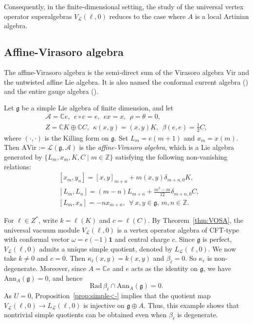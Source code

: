 \documentclass[12pt]{article}
\numberwithin{equation}{section}
\theoremstyle{definition}
\theoremstyle{plain}
\newcommand{\bC}{\ensuremath{\mathbb{C}}}
\newcommand{\bZ}{\ensuremath{\mathbb{Z}}}
\newcommand{\Rad}{\mathrm{Rad }}
\newcommand{\Ann}{\mathrm{Ann }}
\newcommand{\fg}{\mathfrak{g}}
\newcommand{\cA}{\ensuremath{\mathcal{A}}}
\newcommand{\cL}{\ensuremath{\mathcal{L}}}
\newcommand{\bone}{\mathbf{1 }}
\begin{document}
Consequently, in the finite-dimensional setting, the study of the universal vertex operator superalgebras $V_{\cL}(\ell,0)$ reduces to the case where $A$ is a local Artinian algebra.


\subsection{Affine-Virasoro algebra}
\hspace{1.5em}The affine-Virasoro algebra is the semi-direct sum of the Virasoro algebra $\mathrm{Vir}$ and the untwisted affine Lie algebra. It is also named the conformal current algebra (\cite{K86}) and the entire gauge algebra (\cite{EFK}). 

Let $\fg$ be a simple Lie algebra of finite dimension, and let
\begin{gather*}
    \cA=\bC e,\ \ e\circ e=e,\ \ ex=x,\ \ \rho=\theta=0,\\
    Z=\bC K\oplus\bC C,\ \ \kappa(x,y)=(x,y)K,\ \ \beta(e,e)=\frac{1}{2}C,
\end{gather*}
where $(\cdot,\cdot)$ is the Killing form on $\fg$. Set $L_m=e(m+1)$ and $x_m=x(m)$. Then $\mathrm{AVir}:=\cL(\fg,\cA)$ is the \emph{affine-Virasoro algebra}, which is a Lie algebra generated by $\{ L_m,x_m,K,C\mid m\in\bZ\}$ satisfying the following non-vanishing relations:
\begin{align*}
    &[x_m,y_n]=[x,y]_{m+n}+m(x,y)\delta_{m+n,0}K,\\
    &[L_m,L_n]=(m-n)L_{m+n}+\frac{m^3-m}{12}\delta_{m+n,0}C,\\
    &[L_m,x_n]=-nx_{m+n},\ \ \forall\ x,y\in\fg,\,m,n\in\bZ.
\end{align*}

For $\ell\in Z^*$, write $k=\ell(K)$ and $c=\ell(C)$. By Theorem~\ref{thm:VOSA},
the universal vacuum module $V_{\cL}(\ell,0)$ is a vertex operator algebra of CFT-type with conformal vector $\omega=e(-1)\bone$ and central charge $c$. Since $\fg$ is perfect, $V_{\cL}(\ell,0)$ admits a unique simple quotient, denoted by $L_{\cL}(\ell,0)$. We now take $k\neq0$ and $c=0$. Then $\kappa_\ell(x,y)=k(x,y)$ and $\beta_\ell=0$. So $\kappa_\ell$ is non-degenerate. Moreover, since $A=\bC e$ and $e$ acts as the identity on $\fg$, we have $\Ann_A(\fg)=0$, and hence
\begin{equation*}
    \Rad\,\beta_\ell\cap\Ann_A(\fg)=0.
\end{equation*}
As $U=0$, Proposition~\ref{prop:simple<-} implies that the quotient map
$V_{\cL}(\ell,0)\to L_{\cL}(\ell,0)$ is injective on $\fg\oplus A$. Thus, this example shows that nontrivial simple quotients can be obtained even when $\beta_\ell$ is degenerate.
\end{document}
